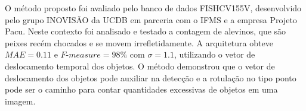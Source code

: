 O método proposto foi avaliado pelo banco de dados FISHCV155V, desenvolvido pelo grupo INOVISÃO da UCDB em parceria com o IFMS e a empresa Projeto Pacu. Neste contexto foi analisado e testado a contagem de alevinos, que são peixes recém chocados e se movem irrefletidamente. A arquitetura obteve $MAE = 0.11$ e $\textit{F-measure} = 98\%$ com $\sigma = 1.1$, utilizando o vetor de deslocamento temporal dos objetos. O método demonstrou que o vetor de deslocamento dos objetos pode auxiliar na detecção e a rotulação no tipo ponto pode ser o caminho para contar quantidades excessivas de objetos em uma imagem.  






